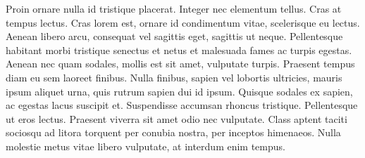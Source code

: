 \documentclass[aps,pre,twocolumn,letterpaper,floatfix,showpacs]{revtex4}
\begin{document}
Proin ornare nulla id tristique placerat. Integer nec elementum tellus. Cras at tempus lectus. Cras lorem est, ornare id condimentum vitae, scelerisque eu lectus. Aenean libero arcu, consequat vel sagittis eget, sagittis ut neque. Pellentesque habitant morbi tristique senectus et netus et malesuada fames ac turpis egestas. Aenean nec quam sodales, mollis est sit amet, vulputate turpis. Praesent tempus diam eu sem laoreet finibus. Nulla finibus, sapien vel lobortis ultricies, mauris ipsum aliquet urna, quis rutrum sapien dui id ipsum. Quisque sodales ex sapien, ac egestas lacus suscipit et. Suspendisse accumsan rhoncus tristique. Pellentesque ut eros lectus. Praesent viverra sit amet odio nec vulputate. Class aptent taciti sociosqu ad litora torquent per conubia nostra, per inceptos himenaeos. Nulla molestie metus vitae libero vulputate, at interdum enim tempus.







\end{document}
